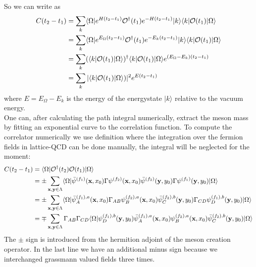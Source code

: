         So we can write  as
        \begin{equation}
            \begin{aligned}
                C(t_2 - t_1) &= \sum_k \langle\Omega|e^{H(t_2 - t_1)}\mathcal{O}^\dagger(t_1)e^{-H(t_2 - t_1)} |k\rangle\langle k| \mathcal{O}(t_1)|\Omega\rangle\\
                &= \sum_k \langle\Omega|e^{E_\Omega(t_2 - t_1)}\mathcal{O}^\dagger(t_1)e^{-E_k(t_2 - t_1)} |k\rangle\langle k| \mathcal{O}(t_1)|\Omega\rangle\\
                &= \sum_k (\langle k|\mathcal{O}(t_1) |\Omega\rangle)^\dagger\langle k| \mathcal{O}(t_1)|\Omega\rangle e^{(E_\Omega - E_k)(t_2 - t_1)}\\
                &= \sum_k |\langle k|\mathcal{O}(t_1) |\Omega\rangle)|^2 e^{E(t_2 - t_1)}\\
            \end{aligned}
        \end{equation}
        where $E = E_\Omega - E_k$ is the energy of the energystate $|k\rangle$ relative to the vacuum energy.\\
        
        One can, after calculating the path integral numerically, extract the meson mass by fitting an exponential curve to the correlation function.
        To compute the correlator numerically we use definition  where the integration over the fermion fields in lattice-QCD can be done manually, the integral will be neglected for the moment:
        \begin{equation}\label{correlation_in_t}
            \begin{aligned}
                C(t_2 - t_1) &= \langle\Omega|\mathcal{O}^\dagger(t_2)\mathcal{O}(t_1)|\Omega\rangle\\
                &= \pm \sum_{\textbf{x},\textbf{y}\in\Lambda}
                \langle\Omega|\bar{\psi}^{(f_1)}(\textbf{x},x_0)\Gamma\psi^{(f_2)}(\textbf{x},x_0)
                \bar{\psi}^{(f_2)}(\textbf{y},y_0)\Gamma\psi^{(f_1)}(\textbf{y},y_0)|\Omega\rangle\\
                &= \pm \sum_{\textbf{x},\textbf{y}\in\Lambda}
                \langle\Omega|\bar{\psi}_A^{(f_1),a}(\textbf{x},x_0)\Gamma_{AB}\psi_B^{(f_2),a}(\textbf{x},x_0)
                \bar{\psi}^{(f_2),b}_C(\textbf{y},y_0)\Gamma_{CD}\psi_D^{(f_1),b}(\textbf{y},y_0)|\Omega\rangle\\
                &= \mp \sum_{\textbf{x},\textbf{y}\in\Lambda}\Gamma_{AB}\Gamma_{CD}
                \langle\Omega|\psi_D^{(f_1),b}(\textbf{y},y_0)\bar{\psi}_A^{(f_1),a}(\textbf{x},x_0)
                \psi_B^{(f_2),a}(\textbf{x},x_0)\bar{\psi}^{(f_2),b}_C(\textbf{y},y_0)|\Omega\rangle
            \end{aligned}
        \end{equation}
        The $\pm$ sign is introduced from the hermition adjoint  of the meson creation operator. In the last line we have an additional minus sign because we interchanged grassmann valued fields three times.\\
        
